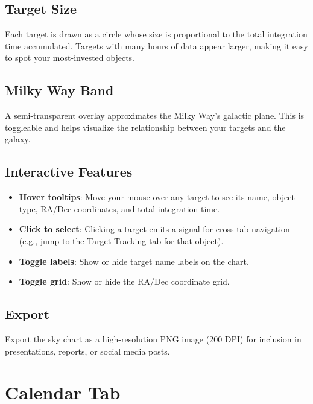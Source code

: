 \documentclass[11pt,a4paper]{article}
\begin{document}
\subsection{Target Size}

Each target is drawn as a circle whose size is proportional to the total integration time accumulated. Targets with many hours of data appear larger, making it easy to spot your most-invested objects.

\subsection{Milky Way Band}

A semi-transparent overlay approximates the Milky Way's galactic plane. This is toggleable and helps visualize the relationship between your targets and the galaxy.

\subsection{Interactive Features}

\begin{itemize}
    \item \textbf{Hover tooltips}: Move your mouse over any target to see its name, object type, RA/Dec coordinates, and total integration time.
    \item \textbf{Click to select}: Clicking a target emits a signal for cross-tab navigation (e.g., jump to the Target Tracking tab for that object).
    \item \textbf{Toggle labels}: Show or hide target name labels on the chart.
    \item \textbf{Toggle grid}: Show or hide the RA/Dec coordinate grid.
\end{itemize}

\subsection{Export}

Export the sky chart as a high-resolution PNG image (200 DPI) for inclusion in presentations, reports, or social media posts.


\section{Calendar Tab}
\label{sec:calendar}
\end{document}
